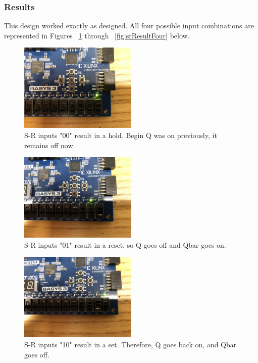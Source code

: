 \documentclass[11pt]{article}
\begin{document}
\subsubsection{Results}
This design worked exactly as designed. All four possible input combinations are represented in Figures ~\ref{fig:srResultOne} through ~\ref{fig:srResultFour} below.

\begin{figure}[H]
\begin{center}
	\includegraphics[width=0.5\textwidth]{./images/img_101.jpg}
	\caption{\label{fig:srResultOne}S-R inputs "00" result in a hold. Begin Q was on previously, it remains off now.}
\end{center}
\end{figure}

\begin{figure}[H]
\begin{center}
	\includegraphics[width=0.5\textwidth]{./images/img_102.jpg}
	\caption{\label{fig:srResultTwo}S-R inputs "01" result in a reset, so Q goes off and Qbar goes on.}
\end{center}
\end{figure}

\begin{figure}[H]
\begin{center}
	\includegraphics[width=0.5\textwidth]{./images/img_103.jpg}
	\caption{\label{fig:srResultThree}S-R inputs "10" result in a set. Therefore, Q goes back on, and Qbar goes off.}
\end{center}
\end{figure}
\end{document}
